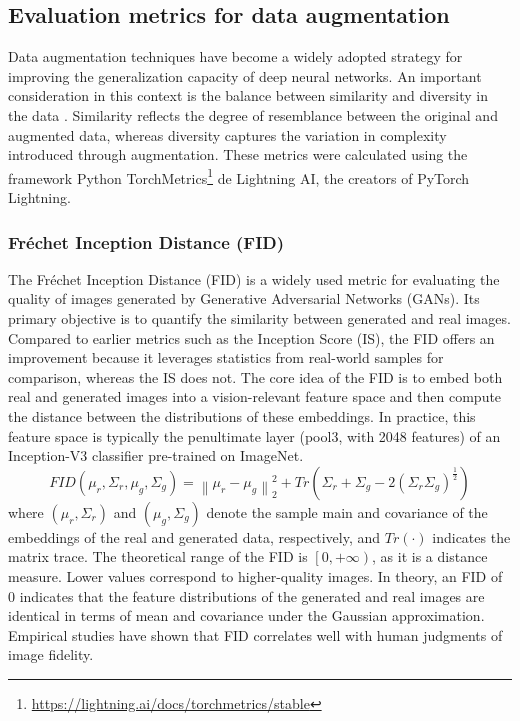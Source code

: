 \documentclass[lettersize,journal]{IEEEtran}
\begin{document}
\subsection{Evaluation metrics for data augmentation}
\noindent Data augmentation techniques have become a widely adopted strategy for improving the generalization capacity of deep neural networks. An important consideration in this context is the balance between similarity and diversity in the data \cite{yang2024investigating}. Similarity reflects the degree of resemblance between the original and augmented data, whereas diversity captures the variation in complexity introduced through augmentation. 
These metrics were calculated using the framework Python TorchMetrics\footnote{\href{https://lightning.ai/docs/torchmetrics/stable}{https://lightning.ai/docs/torchmetrics/stable}} de Lightning AI, the creators of PyTorch Lightning.


\subsubsection{Fréchet Inception Distance (FID)}
The Fréchet Inception Distance (FID) is a widely used metric for evaluating the quality of images generated by Generative Adversarial Networks (GANs)\cite{guven2024image}. Its primary objective is to quantify the similarity between generated and real images\cite{heusel2017gans}. Compared to earlier metrics such as the Inception Score (IS), the FID offers an improvement because it leverages statistics from real-world samples for comparison, whereas the IS does not\cite{kynkäänniemi2023roleimagenetclassesfrechet}.
The core idea of the FID is to embed both real and generated images into a vision-relevant feature space and then compute the distance between the distributions of these embeddings. In practice, this feature space is typically the penultimate layer (pool3, with 2048 features) of an Inception-V3 classifier pre-trained on ImageNet\cite{kynkäänniemi2023roleimagenetclassesfrechet}.
\begin{equation}
FID(\mu_r,\Sigma_r,\mu_g,\Sigma_g )=\left\|\mu_r-\mu_g \right\|_2^2+Tr(\Sigma_r+\Sigma_g-2(\Sigma_r \Sigma_g)^{\frac{1}{2}})
\end{equation}
where $(\mu_r,\Sigma_r)$ and $(\mu_g,\Sigma_g)$ denote the sample main and covariance of the embeddings of the real and generated data, respectively, and $Tr(\cdot)$ indicates the matrix trace\cite{kynkäänniemi2023roleimagenetclassesfrechet}.
The theoretical range of the FID is $\left[0, +\infty\right)$, as it is a distance measure. Lower values correspond to higher-quality images\cite{wang2019improvingmmdgantrainingrepulsive}. In theory, an FID of 0 indicates that the feature distributions of the generated and real images are identical in terms of mean and covariance under the Gaussian approximation\cite{heusel2017gans}.
Empirical studies have shown that FID correlates well with human judgments of image fidelity\cite{heusel2017gans}. 
\end{document}
